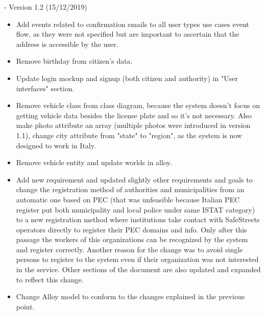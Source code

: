 - Version 1.2 (15/12/2019)
\begin{itemize}
	\item Add events related to confirmation emails to all user types use cases event flow, as they were not specified but are important to ascertain that the address is accessible by the user.
	\item Remove birthday from citizen's data.
	\item Update login mockup and signup (both citizen and authority) in "User interfaces" section.
	\item Remove vehicle class from class diagram, because the system doesn't focus on getting vehicle data besides the license plate and so it's not necessary. Also make photo attribute an array (multiple photos were introduced in version 1.1), change city attribute from "state" to "region", as the system is now designed to work in Italy.
	\item Remove vehicle entity and update worlds in alloy.
	\item Add new requirement and updated slightly other requirements and goals to change the registration method of authorities and municipalities from an automatic one based on PEC (that was unfeasible because Italian PEC register put both municipality and local police under same ISTAT category) to a new registration method where institutions take contact with SafeStreets operators directly to register their PEC domains and info. Only after this passage the workers of this organizations can be recognized by the system and register correctly. Another reason for the change was to avoid single persons to register to the system even if their organization was not interested in the service. Other sections of the document are also updated and expanded to reflect this change.
	\item Change Alloy model to conform to the changes explained in the previous point.
\end{itemize}